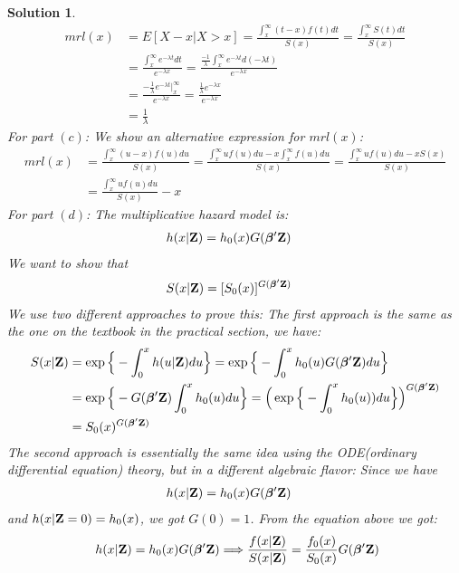 \documentclass[11pt]{article}
\newtheorem{sol}{Solution}
\begin{document}
\begin{sol}
\begin{align*}
		mrl(x) &= E[X - x| X > x] = \frac{\int_x^{\infty}(t - x)f(t) d t}{S(x)} = \frac{\int_x^{\infty}S(t) d t}{S(x)}\\
		&= \frac{\int_x^{\infty}e^{-\lambda t} d t}{e^{-\lambda x}} = \frac{\frac{-1}{\lambda}\int_x^{\infty}e^{-\lambda t}d (-\lambda t)}{e^{-\lambda x}}\\
		&= \frac{-\frac{1}{\lambda}e^{-\lambda t}\Big\vert_x^{\infty}}{e^{-\lambda x}} =\frac{\frac{1}{\lambda}e^{-\lambda x}}{e^{-\lambda x}}\\
		&= \frac{1}{\lambda}
	\end{align*}
	For part $(c)$:\vskip 2mm
	We show an alternative expression for $mrl(x)$:
	\begin{align*}
		mrl(x) &= \frac{\int_x^{\infty}(u - x)f(u) d u}{S(x)} = \frac{\int_x^{\infty} u f(u) d u - x\int_x^{\infty}f(u)d u}{S(x)} = \frac{\int_x^{\infty}uf(u)d u - xS(x)}{S(x)}\\
		&= \frac{\int_x^{\infty} u f(u) d u}{S(x)} - x
	\end{align*}
	For part $(d)$:\vskip 2mm
	The multiplicative hazard model is:
	\begin{align*}
		h(x|{\bf Z}) &= h_0(x)G({\bm \beta}'{\bf Z})
	\end{align*}
	We want to show that
	\begin{align*}
		S(x|{\bf Z}) &= [S_0(x)]^{G({\bm \beta}'{\bf Z})}
	\end{align*}
	We use two different approaches to prove this:\vskip 2mm
	The first approach is the same as the one on the textbook in the practical section, we have:
	\begin{align*}
		S(x|{\bf Z}) &= \exp\Big\{-\int_0^x h(u|{\bf Z}) d u\Big\} = \exp\Big\{-\int_0^x h_0(u)G({\bm \beta}'{\bf Z})d u\Big\}\\
		&= \exp\Big\{-G({\bm \beta}'{\bf Z})\int_0^x h_0(u)d u\Big\} =  \Big(\exp\Big\{-\int_0^x h_0(u))d u\Big\}\Big)^{G({\bm \beta}'{\bf Z})}\\
		&= S_0(x)^{G({\bm \beta}'{\bf Z})}
	\end{align*}
	The second approach is essentially the same idea using the ODE(ordinary differential equation) theory, but in a different algebraic flavor:\vskip 2mm
	Since we have
	\begin{align*}
		h(x|{\bf Z}) &= h_0(x)G({\bm \beta}'{\bf Z})
	\end{align*}
	and $h(x|{\bf Z} = 0) = h_0(x)$, we got $G(0) = 1$.\vskip 2mm
	From the equation above we got:
	\begin{align*}
		&\ h(x|{\bf Z}) = h_0(x)G({\bm \beta}'{\bf Z}) \Longrightarrow \frac{f(x|{\bf Z})}{S(x|{\bf Z})} = \frac{f_0(x)}{S_0(x)}G({\bm \beta}'{\bf Z})\\

\end{align*}
\end{sol}
\end{document}
